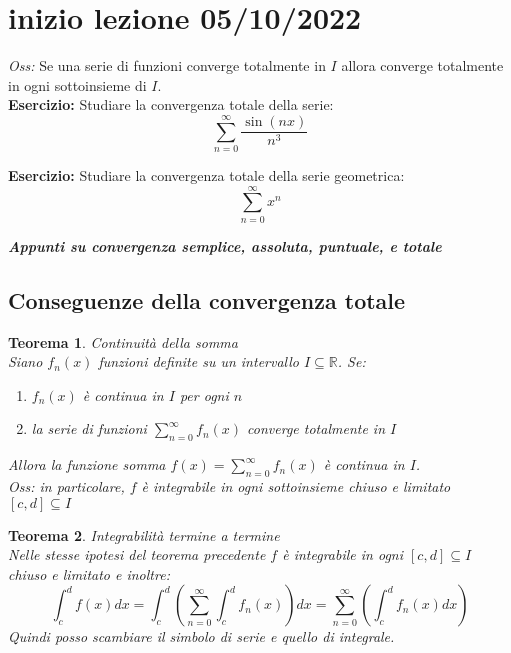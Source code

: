 \documentclass{scrreprt}
\newtheorem{teorema}{Teorema}
\newenvironment{thm}{\begin{mdframed}[backgroundcolor=Ivory2]\begin{teorema}}{\end{teorema}\end{mdframed}}
\begin{document}
\section*{inizio lezione 05/10/2022}
\emph{Oss:} Se una serie di funzioni converge totalmente in $I$ allora converge totalmente in ogni sottoinsieme di $I$.\\
\textbf{Esercizio:} Studiare la convergenza totale della serie:\\
\begin{equation}
	\sum_{n=0}^\infty \frac{\sin{(nx)}}{n^3}
\end{equation}

\textbf{Esercizio:} Studiare la convergenza totale della serie geometrica:\\
\begin{equation}
	\sum_{n=0}^\infty x^n
\end{equation}

\textbf{\emph{Appunti su convergenza semplice, assoluta, puntuale, e totale}\\}
\subsection{Conseguenze della convergenza totale}
\begin{thm} Continuità della somma\\
	Siano $f_n(x)$ funzioni definite su un intervallo $I\subseteq \mathbb{R}$. Se:
	\begin{enumerate}
		\item[$i)$] $f_n(x)$ è continua in $I$ per ogni $n$
		\item[$ii)$] la serie di funzioni $\sum_{n=0}^\infty f_n(x)$ converge totalmente in $I$
	\end{enumerate}
	Allora la funzione somma $f(x) = \sum_{n=0}^\infty f_n(x)$ è continua in $I$.\\
\emph{Oss:} in particolare, $f$ è integrabile in ogni sottoinsieme chiuso e limitato $\left[c,d\right] \subseteq I$
\end{thm}

\begin{thm} Integrabilità termine a termine\\
	Nelle stesse ipotesi del teorema precedente $f$ è integrabile in ogni $\left[c,d\right] \subseteq I$ chiuso e limitato e inoltre:
	\begin{equation}
		\int_{c}^{d} f(x) dx = \int_{c}^{d} \left(\sum_{n=0}^\infty \int_{c}^{d} f_n(x)\right)  dx = \sum_{n=0}^\infty \left(\int_{c}^{d} f_n(x) dx\right) 
	\end{equation}
	Quindi posso scambiare il simbolo di serie e quello di integrale.
\end{thm}
\end{document}
